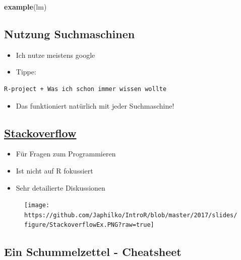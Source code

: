 \documentclass[]{article}
\newenvironment{Shaded}{\begin{snugshade}}{\end{snugshade}}
\newcommand{\KeywordTok}[1]{\textcolor[rgb]{0.13,0.29,0.53}{\textbf{{#1}}}}
\newcommand{\NormalTok}[1]{{#1}}
\providecommand{\tightlist}{%
  \setlength{\itemsep}{0pt}\setlength{\parskip}{0pt}}
\begin{document}
\begin{Shaded}
\begin{Highlighting}[]
\KeywordTok{example}\NormalTok{(lm)}
\end{Highlighting}
\end{Shaded}

\subsection{Nutzung Suchmaschinen}\label{nutzung-suchmaschinen}

\begin{itemize}
\tightlist
\item
  Ich nutze meistens google
\item
  Tippe:
\end{itemize}

\begin{verbatim}
R-project + Was ich schon immer wissen wollte
\end{verbatim}

\begin{itemize}
\tightlist
\item
  Das funktioniert natürlich mit jeder Suchmaschine!
\end{itemize}

\subsection{\texorpdfstring{\href{http://stackoverflow.com/}{Stackoverflow}}{Stackoverflow}}\label{stackoverflow}

\begin{itemize}
\tightlist
\item
  Für Fragen zum Programmieren
\item
  Ist nicht auf R fokussiert
\item
  Sehr detailierte Diskussionen
\end{itemize}

\begin{figure}[htbp]
\centering
\texttt{[image: https://github.com/Japhilko/IntroR/blob/master/2017/slides/figure/StackoverflowEx.PNG?raw=true]}
\caption{}
\end{figure}

\subsection{Ein Schummelzettel -
Cheatsheet}\label{ein-schummelzettel---cheatsheet}
\end{document}
